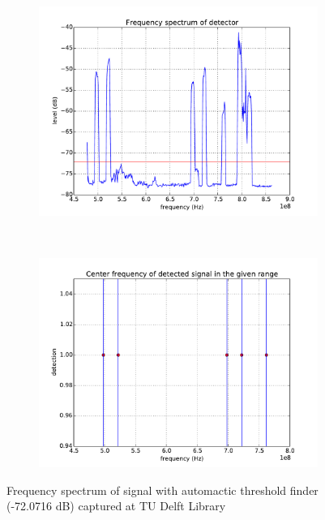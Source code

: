 \begin{figure}[H]
    \centering
    \begin{subfigure}[b]{0.45\textwidth}
        \includegraphics[width=\textwidth]{figures/lib-auto-freq}
    \end{subfigure}
    ~ %
    \begin{subfigure}[b]{0.45\textwidth}
        \includegraphics[width=\textwidth]{figures/lib-auto-center}
    \end{subfigure}
    \caption{Frequency spectrum of signal with automactic threshold finder (-72.0716 dB) captured at TU Delft Library}\label{fig:freq-lib-auto}
\end{figure}


